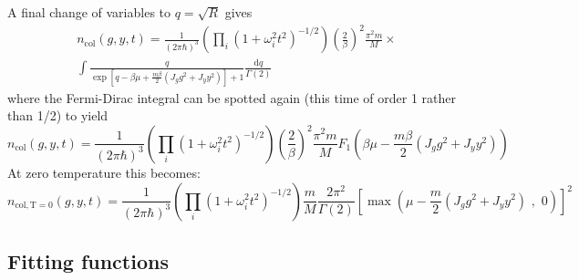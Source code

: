 A final change of variables to $q = \sqrt{R}$ gives
\begin{multline}
n_{\mathrm{col}}(g,y,t) =  
   \frac{ 1 } { (2\pi\hbar)^{3}}  
   \left(\prod_{i} (1 + \omega_{i}^{2}t^{2})^{-1/2} \right)  
  \left(\frac{2}{\beta}\right)^{2}\frac{\pi^{2} m}{M} \times \\ 
   \int  \frac{q}{\exp\left[ q - \beta\mu 
     + \frac{m\beta}{2}( J_{g}g^{2} + J_{y} y^{2} ) \right] + 1   } 
   \frac{\mathrm{d} q }{\Gamma(2)}
\end{multline}
where the Fermi-Dirac integral can be spotted again (this time of order 1
rather than 1/2) to yield
\begin{equation}
n_{\mathrm{col}}(g,y,t) =  \frac{ 1 } { (2\pi\hbar)^{3}}  
   \left(\prod_{i} (1 + \omega_{i}^{2}t^{2})^{-1/2} \right)  
   \left(\frac{2}{\beta}\right)^{2}\frac{\pi^{2} m}{M} F_{1} 
   \left( \beta\mu  - \frac{m\beta}{2}  ( J_{g}g^{2} + J_{y} y^{2} )\right)
\label{eq:ncol-fun} 
\end{equation}
At zero temperature this becomes: 
\begin{equation}
n_{\mathrm{col,T=0}}(g,y,t) =  
  \frac{ 1 } { (2\pi\hbar)^{3}} 
   \left(\prod_{i} (1 + \omega_{i}^{2}t^{2})^{-1/2} \right) 
    \frac{m}{M}  \frac{ 2\pi^{2}}{\Gamma(2)} 
 \left[ \max\left( \mu - \frac{m}{2}( J_{g}g^{2} + J_{y} y^{2} ) \,\, , \,\,  0 \right) \right]^{2}
\end{equation}


\subsection{Fitting functions}

